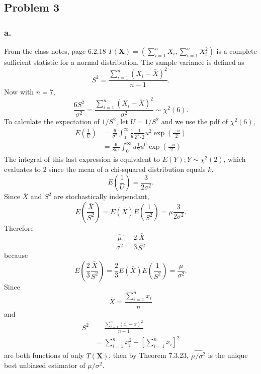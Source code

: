 \documentclass{article}
\begin{document}
\subsection*{Problem 3}
\subsubsection*{a.}
From the class notes, page 6.2.18 $T(\mathbf{X}) = (\sum_{i=1}^nX_i, \sum_{i=1}^nX_i^2)$ is a complete sufficient statistic for a normal distribution. The sample variance is defined as \[S^2=\frac{\sum_{i=1}^n\left(X_i-\bar{X}\right)^2}{n-1}.\] Now with $n=7$, \[\frac{6S^2}{\sigma^2} = \frac{\sum_{i=1}^n\left(X_i-\bar{X}\right)^2}{\sigma^2} \sim \chi^2(6).\] To calculate the expectation of $1/S^2$, let $U = 1/S^2$ and we use the pdf of $\chi^2(6)$,
\begin{align*}
E\left(\frac{1}{U}\right)&=\frac{6}{\sigma^2}\int_0^\infty\frac{1}{u}\frac{1}{2^3\cdot2}u^2\exp\left(\frac{-u}{2}\right) \\
&=\frac{6}{8\sigma^2}\int_0^\infty u\frac{1}{2}u^0\exp\left(\frac{-u}{2}\right)
\end{align*}
The integral of this last expression is equivalent to $E(Y); Y\sim\chi^2(2)$, which evaluates to $2$ since the mean of a chi-squared distribution equals $k$.
\[E\left(\frac{1}{U}\right) = \frac{3}{2\sigma^2}.\]
Since $\bar{X}$ and $S^2$ are stochastically independant, 
\[E\left(\frac{\bar{X}}{S^2}\right) = E(\bar{X})E\left(\frac{1}{S^2}\right) = \mu\frac{3}{2\sigma^2}.\]
Therefore \[\widehat{\frac{\mu}{\sigma^2}} = \frac{2}{3}\frac{\bar{X}}{S^2}\] because 
\[E\left(\frac{2}{3}\frac{\bar{X}}{S^2}\right) = \frac{2}{3}E(\bar{X})E\left(\frac{1}{S^2}\right) = \frac{\mu}{\sigma^2}.\] 
Since \[\bar{X} = \frac{\sum_{i=1}^n x_i}{n}\] and 
\begin{align*}
S^2 &= \frac{\sum_{i=1}^n\left(x_i-\bar{x}\right)^2}{n-1} \\
&= \sum_{i=1}^n x_i^2 - \left[\sum_{i=1}^n x_i\right]^2
\end{align*}
are both functions of only $T(\mathbf{X})$, then by Theorem 7.3.23, $\widehat{\mu/\sigma^2}$ is the unique best unbiased estimator of $\mu/\sigma^2$.
\end{document}
